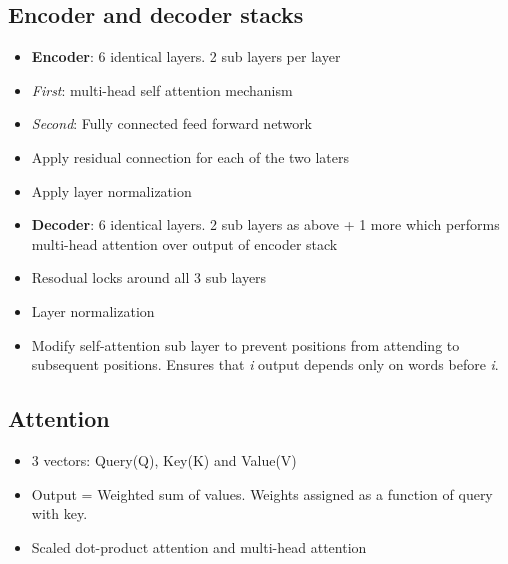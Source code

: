 \documentclass[a4paper]{article}
\begin{document}
\subsection{Encoder and decoder stacks}
\begin{itemize}
    \item \textbf{Encoder}: 6 identical layers. 2 sub layers per layer
    \item \textit{First}: multi-head self attention mechanism
    \item \textit{Second}: Fully connected feed forward network
    \item Apply residual connection for each of the two laters
    \item Apply layer normalization
    \item \textbf{Decoder}: 6 identical layers. 2 sub layers as above + 1 more which performs multi-head attention over output of encoder stack 
    \item Resodual locks around all 3 sub layers
    \item Layer normalization
    \item Modify self-attention sub layer to prevent positions from attending to subsequent positions. Ensures that \textit{i} output depends only on words before \textit{i}.
\end{itemize}
\subsection{Attention}
\begin{itemize}
    \item 3 vectors: Query(Q), Key(K) and Value(V)
    \item Output = Weighted sum of values. Weights assigned as a function of query with key.
    \item Scaled dot-product attention and multi-head attention
\end{itemize}
\end{document}
